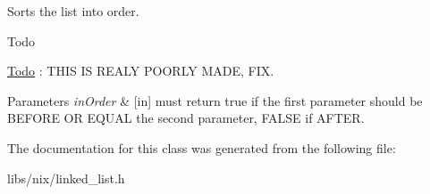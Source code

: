 Sorts the list into order. 

\begin{DoxyRefDesc}{Todo}
\item[\hyperlink{todo__todo000001}{Todo}]\+: T\+H\+IS IS R\+E\+A\+LY P\+O\+O\+R\+LY M\+A\+DE, F\+IX.\end{DoxyRefDesc}



\begin{DoxyParams}{Parameters}
{\em in\+Order} & \mbox{[}in\mbox{]} must return true if the first parameter should be B\+E\+F\+O\+RE OR E\+Q\+U\+AL the second parameter, F\+A\+L\+SE if A\+F\+T\+ER. \\
\hline
\end{DoxyParams}


The documentation for this class was generated from the following file\+:\begin{DoxyCompactItemize}
\item 
libs/nix/linked\+\_\+list.\+h\end{DoxyCompactItemize}
